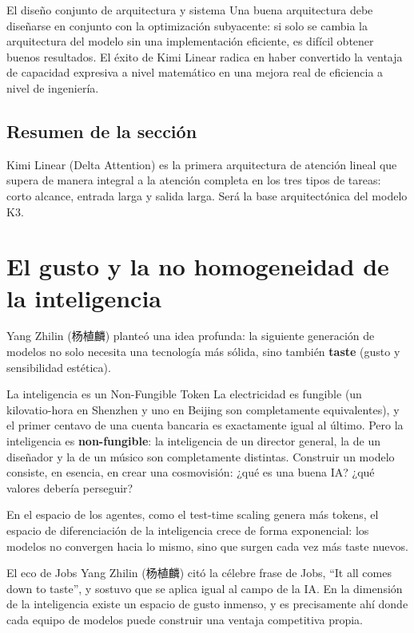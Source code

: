 \documentclass[a4paper]{article}
\begin{document}
\begin{warningbox}{El diseño conjunto de arquitectura y sistema}
Una buena arquitectura debe diseñarse en conjunto con la optimización subyacente: si solo se cambia la arquitectura del modelo sin una implementación eficiente, es difícil obtener buenos resultados. El éxito de Kimi Linear radica en haber convertido la ventaja de capacidad expresiva a nivel matemático en una mejora real de eficiencia a nivel de ingeniería.
\end{warningbox}

\subsection{Resumen de la sección}

Kimi Linear (Delta Attention) es la primera arquitectura de atención lineal que supera de manera integral a la atención completa en los tres tipos de tareas: corto alcance, entrada larga y salida larga. Será la base arquitectónica del modelo K3.

\section{El gusto y la no homogeneidad de la inteligencia}

Yang Zhilin (杨植麟) planteó una idea profunda: la siguiente generación de modelos no solo necesita una tecnología más sólida, sino también \textbf{taste} (gusto y sensibilidad estética).

\begin{importantbox}{La inteligencia es un Non-Fungible Token}
La electricidad es fungible (un kilovatio-hora en Shenzhen y uno en Beijing son completamente equivalentes), y el primer centavo de una cuenta bancaria es exactamente igual al último. Pero la inteligencia es \textbf{non-fungible}: la inteligencia de un director general, la de un diseñador y la de un músico son completamente distintas. Construir un modelo consiste, en esencia, en crear una cosmovisión: ¿qué es una buena IA? ¿qué valores debería perseguir?
\end{importantbox}

En el espacio de los agentes, como el test-time scaling genera más tokens, el espacio de diferenciación de la inteligencia crece de forma exponencial: los modelos no convergen hacia lo mismo, sino que surgen cada vez más taste nuevos.

\begin{knowledgebox}{El eco de Jobs}
Yang Zhilin (杨植麟) citó la célebre frase de Jobs, ``It all comes down to taste'', y sostuvo que se aplica igual al campo de la IA. En la dimensión de la inteligencia existe un espacio de gusto inmenso, y es precisamente ahí donde cada equipo de modelos puede construir una ventaja competitiva propia.
\end{knowledgebox}
\end{document}
